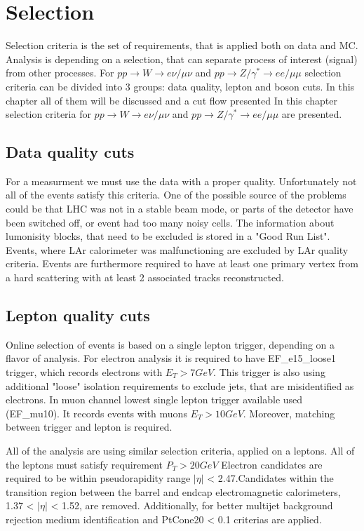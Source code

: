 \chapter{Selection}\label{chap:EventSelection}
Selection criteria is the set of requirements, that is applied both on data and MC. Analysis is depending on a selection, that can separate process of interest (signal) from other processes. For $pp \to W \to e\nu/\mu\nu$ and $pp \to Z/\gamma^* \to ee/\mu\mu$ selection criteria can be divided into 3 groups: data quality, lepton and boson cuts. In this chapter all of them will be discussed and a cut flow presented
In this chapter selection criteria for $pp \to W \to e\nu/\mu\nu$ and $pp \to Z/\gamma^* \to ee/\mu\mu$  are presented.  
\section{Data quality cuts}



For a measurment we must use the data with a proper quality. Unfortunately not all of the events satisfy this criteria. One of the possible source of the problems could be that LHC was not in a stable beam mode, or parts of the detector have been switched off, or event had too many noisy cells. The information about lumonisity blocks, that need to be excluded is stored in a "Good Run List".  Events, where LAr calorimeter was malfunctioning are excluded by LAr quality criteria. 
Events are furthermore required to have at least one primary vertex from a hard scattering with at least 2 associated tracks reconstructed. 

\section{Lepton quality cuts}
Online selection of events is based on a single lepton trigger, depending on a flavor of analysis. For electron analysis it is required to have EF\_e15\_loose1 trigger, which records electrons with $E_T>7 GeV$. This trigger is also using additional "loose" isolation requirements to exclude jets, that are misidentified as electrons. In muon channel lowest single lepton trigger available used (EF\_mu10).  It records events with muons $E_T>10 GeV$.  Moreover, matching between trigger and lepton is required.

All of the analysis are using similar selection criteria, applied on a leptons. All of the leptons must satisfy requirement $P_T > 20 GeV$
Electron candidates are required to be within pseudorapidity range $|\eta|$ < 2.47.Candidates within the transition region between the barrel and endcap electromagnetic calorimeters, 1.37 < $|\eta|$ < 1.52, are removed.  Additionally, for better multijet background rejection  medium identification and PtCone20 < 0.1 criterias are applied.

